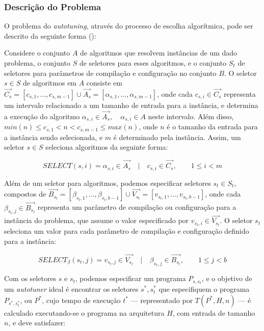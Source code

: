 \documentclass[a4paper, 11pt]{article}
\begin{document}
\subsubsection{Descrição do Problema}

O problema do \emph{autotuning}, através do processo de escolha algorítmica,
pode ser descrito da seguinte forma (\citet{ansel2011efficient}):

Considere o conjunto $A$ de algoritmos que resolvem instâncias de um dado 
problema, o conjunto $S$ de seletores para esses algoritmos, e o conjunto $S_t$
de seletores para parâmetros de compilação e configuração no conjunto $B$.
O seletor $s \in S$ de algoritmos em $A$ consiste em 
$\overrightarrow{C_s} = [c_{s,1},\dots,c_{s,m-1}] \cup \overrightarrow{A_s} = 
[\alpha_{s,1},\dots,\alpha_{s,m-1}]$,
onde cada $c_{s,i} \in \overrightarrow{C_s}$ representa um intervalo 
relacionado a um tamanho de entrada para a instância, e 
determina a execução do algoritmo $\alpha_{s,i} \in \overrightarrow{A_s}, 
\quad \alpha_{s,i} \in A$ neste intervalo. 
Além disso, $min(n) \leq c_{s,1} < n < c_{s,m-1} \leq max(n)$,
onde $n$ é o tamanho da entrada para a instância sendo selecionada, e $m$ 
é determinado pela instância.
Assim, um seletor $s \in S$ seleciona algoritmos da seguinte forma:

\begin{equation*}
    SELECT(s, i) = \alpha_{s,i} \in \overrightarrow{A_{s}} \quad | \quad c_{s,i} \in \overrightarrow{C_{s}},
    \quad\quad 1 \leq i < m
\end{equation*}

Além de um seletor para algoritmos, podemos especificar seletores $s_t \in S_t$,
compostos de $\overrightarrow{B_{s_t}} = [\beta_{s_t,1},\dots,\beta_{s_t,b-1}] 
\cup \overrightarrow{V_{s_t}} = [v_{s_t,1},\dots,v_{s_t,b-1}]$,
onde cada $\beta_{s_t,j} \in \overrightarrow{B_{s_t}}$ representa um parâmetro
de compilação ou configuração para a instância do problema, que assume o valor
especificado por $v_{s_t,i} \in \overrightarrow{V_{s_t}}$.
O seletor $s_t$ seleciona um valor para cada parâmetro de compilação e 
configuração definido para a instância:

\begin{equation*}
    SELECT_{\beta}(s_t, j) = v_{s_t,j} \in \overrightarrow{V_{s_t}} \quad | \quad \beta_{s_t,j} \in \overrightarrow{B_{s_t}},
    \quad\quad 1 \leq j < b
\end{equation*}

Com os seletores $s$ e $s_t$, podemos especificar um programa
$P_{s,s_t}$, e o objetivo de um \emph{autotuner} ideal é encontrar
os seletores $s^*,s_{t}^{*}$ que especifiquem o programa $P_{s^*,s_{t}^{*}}$, 
ou $P^*$, cujo tempo de execução $t^*$ --- representado por $T(P^*,H,n)$ --- 
é calculado executando-se o programa na arquitetura $H$, com entrada de tamanho
$n$, e deve satisfazer:
\end{document}
